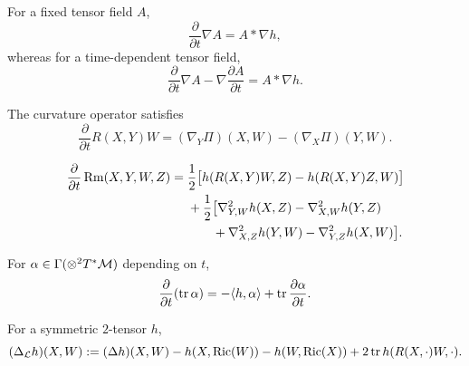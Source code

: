 \begin{remark}
\label{topping:variation-covariant-derivative-star}
For a fixed tensor field $A$,
\[
\frac{\partial}{\partial t}\nabla A=A*\nabla h,
\]
whereas for a time-dependent tensor field,
\[
\frac{\partial}{\partial t}\nabla A-\nabla\frac{\partial A}{\partial t}=A*\nabla h.
\]
\end{remark}

\begin{proposition}
\label{topping:variation-curvature-operator}
The curvature operator satisfies
\[
\frac{\partial}{\partial t}R(X,Y)W=(\nabla_Y\Pi)(X,W)-(\nabla_X\Pi)(Y,W).
\]
\end{proposition}

\begin{proposition}
\label{topping:variation-riemann-tensor}
\[
\begin{aligned}
\frac{\partial}{\partial t}\operatorname{Rm}(X,Y,W,Z)
={}&\frac12\bigl[h(R(X,Y)W,Z)-h(R(X,Y)Z,W)\bigr]\\
&+\frac12\bigl[\nabla^2_{Y,W}h(X,Z)-\nabla^2_{X,W}h(Y,Z)\\
&\qquad+\nabla^2_{X,Z}h(Y,W)-\nabla^2_{Y,Z}h(X,W)\bigr].
\end{aligned}
\]
\end{proposition}

\begin{proposition}
\label{topping:variation-trace}
For $\alpha\in\Gamma(\otimes^2T^*\mathcal{M})$ depending on $t$,
\[
\frac{\partial}{\partial t}(\operatorname{tr}\alpha)
=-\langle h,\alpha\rangle+\operatorname{tr}\frac{\partial\alpha}{\partial t}.
\]
\end{proposition}

\begin{definition}
\label{topping:variation-lichnerowicz}
\leanok
For a symmetric $2$-tensor $h$,
\[
(\Delta_{\mathcal L}h)(X,W):=(\Delta h)(X,W)-h(X,\operatorname{Ric}(W))-h(W,\operatorname{Ric}(X))
+2\operatorname{tr} h(R(X,\cdot)W,\cdot).
\]
\end{definition}

